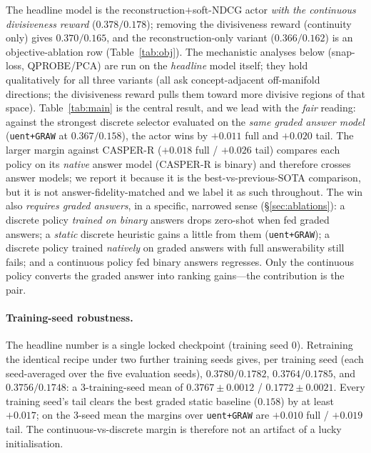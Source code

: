 \documentclass[11pt]{article}
\begin{document}
The headline model is the reconstruction$+$soft-NDCG actor \emph{with the continuous divisiveness reward}
($0.378/0.178$); removing the divisiveness reward (continuity only) gives $0.370/0.165$, and the reconstruction-only
variant ($0.366/0.162$) is an objective-ablation row (Table~\ref{tab:obj}). The mechanistic analyses below (snap-loss,
QPROBE/PCA) are run on the \emph{headline} model itself; they hold qualitatively for all three variants (all ask
concept-adjacent off-manifold directions; the divisiveness reward pulls them toward more divisive regions of that space).
Table~\ref{tab:main} is the central result, and we lead with the \emph{fair} reading: against the strongest discrete
selector evaluated on the \emph{same graded answer model} (\texttt{uent+GRAW} at $0.367/0.158$), the actor wins by
$+0.011$ full and $+0.020$ tail. The larger margin against CASPER-R ($+0.018$ full / $+0.026$ tail) compares each
policy on its \emph{native} answer model (CASPER-R is binary) and therefore crosses answer models; we report it because
it is the best-vs-previous-SOTA comparison, but it is not answer-fidelity-matched and we label it as such throughout.
The win also \emph{requires graded answers}, in a specific, narrowed sense (\S\ref{sec:ablations}): a discrete policy
\emph{trained on binary} answers drops zero-shot when fed graded answers; a \emph{static} discrete heuristic gains a
little from them (\texttt{uent+GRAW}); a discrete policy trained \emph{natively} on graded answers with full
answerability still fails; and a continuous policy fed binary answers regresses. Only the continuous policy converts
the graded answer into ranking gains---the contribution is the pair.

\paragraph{Training-seed robustness.} The headline number is a single locked checkpoint (training seed $0$). Retraining
the identical recipe under two further training seeds gives, per training seed (each seed-averaged over the five
evaluation seeds), $0.3780/0.1782$, $0.3764/0.1785$, and $0.3756/0.1748$: a $3$-training-seed mean of
$\mathbf{0.3767\pm0.0012}$ / $\mathbf{0.1772\pm0.0021}$. Every training seed's tail clears the best graded static
baseline ($0.158$) by at least $+0.017$; on the $3$-seed mean the margins over \texttt{uent+GRAW} are $+0.010$ full /
$+0.019$ tail. The continuous-vs-discrete margin is therefore not an artifact of a lucky initialisation.
\end{document}
